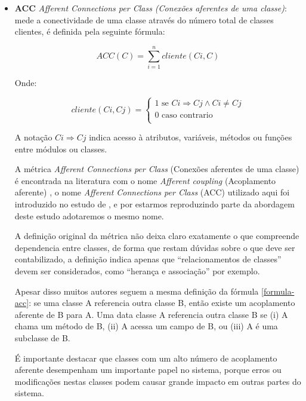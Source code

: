 \begin{itemize}
  \item {\bf ACC} {\it Afferent Connections per Class (Conexões aferentes de
    uma classe)}: mede a conectividade de uma classe através do número total de
    classes clientes, é definida pela seguinte fórmula:

\begin{equation}
\label{formula-acc}
ACC(C) = \sum_{i=1}^{n} cliente(Ci, C)
\end{equation}

Onde:

\begin{equation}
cliente(Ci, Cj) =
  \begin{cases}
    1 \text{ se } Ci \Rightarrow Cj \wedge Ci \neq Cj \\
    0 \text{ caso contrario} \\
  \end{cases}
\end{equation}

A notação $ Ci \Rightarrow Cj $ indica acesso à atributos, variáveis, métodos
ou funções entre módulos ou classes.

A métrica {\it Afferent Connections per Class} (Conexões aferentes de uma
classe) é encontrada na literatura com o nome {\it Afferent coupling}
(Acoplamento aferente) \cite{Martin1994}, o nome {\it Afferent Connections per
Class} (ACC) utilizado aqui foi introduzido no estudo de
, e por estarmos reproduzindo parte da abordagem
deste estudo adotaremos o mesmo nome.

A definição original da métrica não deixa claro exatamente o que compreende
dependencia entre classes, de forma que restam dúvidas sobre o que deve ser
contabilizado, a definição indica apenas que ``relacionamentos de classes''
devem ser considerados, como ``herança e associação'' por exemplo.

Apesar disso muitos autores \cite{Briand1999Unified, Fenton2014, Ferreira2008}
seguem a mesma definição da fórmula \ref{formula-acc}:
se uma classe A referencia outra classe B, então existe um acoplamento aferente
de B para A. Uma data classe A referencia outra classe B se (i) A chama um
método de B, (ii) A acessa um campo de B, ou (iii) A é uma subclasse de B.

É importante destacar que classes com um alto número de acoplamento aferente
desempenham um importante papel no sistema, porque erros ou modificações nestas
classes podem causar grande impacto em outras partes do sistema.


\end{itemize}
